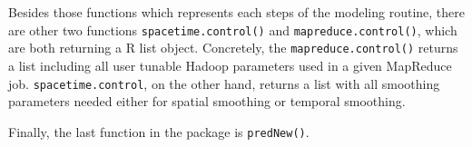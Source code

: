 Besides those functions which represents each steps of the modeling routine, 
there are other two functions \texttt{spacetime.control()} and 
\texttt{mapreduce.control()}, which are both returning a R list object. Concretely,
the \texttt{mapreduce.control()} returns a list including all user tunable 
Hadoop parameters used in a given MapReduce job. \texttt{spacetime.control}, on
the other hand, returns a list with all smoothing parameters needed either for
spatial smoothing or temporal smoothing. 

Finally, the last function in the package is \texttt{predNew()}.